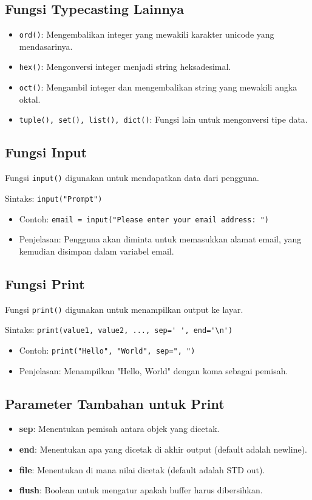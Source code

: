 \documentclass{article}
\begin{document}
\subsection{Fungsi Typecasting Lainnya}
\begin{itemize}
    \item \verb|ord()|: Mengembalikan integer yang mewakili karakter unicode yang mendasarinya.
    \item \verb|hex()|: Mengonversi integer menjadi string heksadesimal.
    \item \verb|oct()|: Mengambil integer dan mengembalikan string yang mewakili angka oktal.
    \item \verb|tuple(), set(), list(), dict()|: Fungsi lain untuk mengonversi tipe data.
\end{itemize}

\subsection{Fungsi Input}
Fungsi \verb|input()| digunakan untuk mendapatkan data dari pengguna.

Sintaks: \verb|input("Prompt")|
\begin{itemize}
    \item Contoh: \verb|email = input("Please enter your email address: ")|
    \item Penjelasan: Pengguna akan diminta untuk memasukkan alamat email, yang kemudian disimpan dalam variabel email.
\end{itemize}

\subsection{Fungsi Print}
Fungsi \verb|print()| digunakan untuk menampilkan output ke layar.

Sintaks: \verb|print(value1, value2, ..., sep=' ', end='\n')|
\begin{itemize}
    \item Contoh: \verb|print("Hello", "World", sep=", ")|
    \item Penjelasan: Menampilkan "Hello, World" dengan koma sebagai pemisah.
\end{itemize}

\subsection{Parameter Tambahan untuk Print}
\begin{itemize}
    \item \textbf{sep}: Menentukan pemisah antara objek yang dicetak.
    \item \textbf{end}: Menentukan apa yang dicetak di akhir output (default adalah newline).
    \item \textbf{file}: Menentukan di mana nilai dicetak (default adalah STD out).
    \item \textbf{flush}: Boolean untuk mengatur apakah buffer harus dibersihkan.
\end{itemize}
\end{document}
